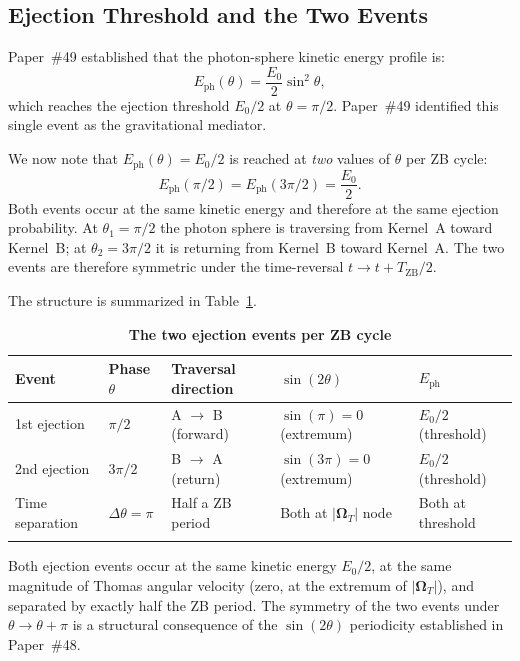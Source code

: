 \documentclass[%
 reprint, amsmath,amssymb, aps, prb, ]{revtex4-2}
\numberwithin{equation}{section}
\newcommand{\iphase}{\theta}
\newcommand{\OmT}{\boldsymbol{\Omega}_T}
\begin{document}
\subsection{Ejection Threshold and the Two Events}

Paper~\#49 established that the photon-sphere kinetic energy profile is:
\begin{equation}
E_\mathrm{ph}(\iphase) = \frac{E_0}{2}\sin^2\iphase,
\label{eq:eph}
\end{equation}
which reaches the ejection threshold $E_0/2$ at $\iphase = \pi/2$.
Paper~\#49 identified this single event as the gravitational mediator.

We now note that $E_\mathrm{ph}(\iphase) = E_0/2$ is reached at \emph{two} values of $\iphase$ per ZB cycle:
\begin{equation}
E_\mathrm{ph}(\pi/2) = E_\mathrm{ph}(3\pi/2) = \frac{E_0}{2}.
\label{eq:two_thresholds}
\end{equation}
Both events occur at the same kinetic energy and therefore at the same ejection probability.
At $\iphase_1 = \pi/2$ the photon sphere is traversing from Kernel~A toward Kernel~B;
at $\iphase_2 = 3\pi/2$ it is returning from Kernel~B toward Kernel~A.
The two events are therefore symmetric under the time-reversal $t \to t + T_\mathrm{ZB}/2$.

The structure is summarized in Table~\ref{tab:two_events}.

\begin{table}[t!]
\centering
\caption{\textbf{The two ejection events per ZB cycle}}
\label{tab:two_events}
\renewcommand{\arraystretch}{1.4}
\begin{tabular}{p{2.5cm}p{3.5cm}p{3.5cm}p{3.0cm}p{3.0cm}}
\toprule
\textbf{Event} & \textbf{Phase $\iphase$} & \textbf{Traversal direction} & \textbf{$\sin(2\iphase)$} & \textbf{$E_\mathrm{ph}$} \\
\midrule
1st ejection
& $\pi/2$
& A $\to$ B (forward)
& $\sin(\pi) = 0$ (extremum)
& $E_0/2$ (threshold) \\
\addlinespace[0.3cm]
2nd ejection
& $3\pi/2$
& B $\to$ A (return)
& $\sin(3\pi) = 0$ (extremum)
& $E_0/2$ (threshold) \\
\addlinespace[0.3cm]
Time separation
& $\Delta\iphase = \pi$
& Half a ZB period
& Both at $|\OmT|$ node
& Both at threshold \\
\addlinespace[0.2cm]
\bottomrule
\end{tabular}
\vspace{0.2cm}
\begin{minipage}{0.95\textwidth}
\justifying\footnotesize
Both ejection events occur at the same kinetic energy $E_0/2$, at the same magnitude of Thomas angular velocity (zero, at the extremum of $|\OmT|$), and separated by exactly half the ZB period. The symmetry of the two events under $\iphase \to \iphase + \pi$ is a structural consequence of the $\sin(2\iphase)$ periodicity established in Paper~\#48.
\end{minipage}
\end{table}
\end{document}

